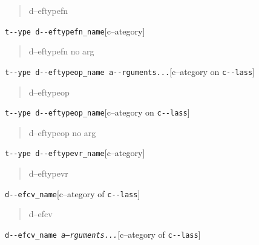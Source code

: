 \documentclass{book}
\begin{document}
\begin{titlepage}
%
\begin{quote}
\unskip{\parskip=0pt\noindent}%
d--eftypefn
\end{quote}

\noindent\texttt{t{-}{-}ype d{-}{-}eftypefn\_name}\hfill[c--ategory]



%
\begin{quote}
\unskip{\parskip=0pt\noindent}%
d--eftypefn no arg
\end{quote}

\noindent\texttt{t{-}{-}ype d{-}{-}eftypeop\_name a{-}{-}rguments...}\hfill[c--ategory on \texttt{c{-}{-}lass}]



%
\begin{quote}
\unskip{\parskip=0pt\noindent}%
d--eftypeop
\end{quote}

\noindent\texttt{t{-}{-}ype d{-}{-}eftypeop\_name}\hfill[c--ategory on \texttt{c{-}{-}lass}]



%
\begin{quote}
\unskip{\parskip=0pt\noindent}%
d--eftypeop no arg
\end{quote}

\noindent\texttt{t{-}{-}ype d{-}{-}eftypevr\_name}\hfill[c--ategory]



%
\begin{quote}
\unskip{\parskip=0pt\noindent}%
d--eftypevr
\end{quote}

\noindent\texttt{d{-}{-}efcv\_name}\hfill[c--ategory of \texttt{c{-}{-}lass}]



%
\begin{quote}
\unskip{\parskip=0pt\noindent}%
d--efcv
\end{quote}

\noindent\texttt{d{-}{-}efcv\_name \EmbracOn{}\textnormal{\textsl{a--rguments...}}\EmbracOff{}}\hfill[c--ategory of \texttt{c{-}{-}lass}]




\end{titlepage}
\end{document}
